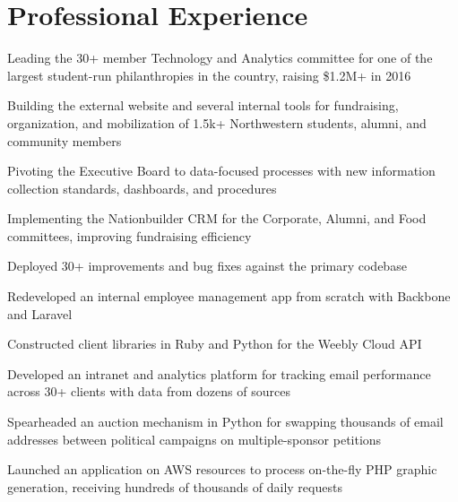 
\section{Professional Experience}

\vspace{\topsep}
\begin{listitems}
\item Leading the 30+ member Technology and Analytics committee for one of the largest student-run philanthropies in the country, raising \$1.2M+ in 2016
\item Building the external website and several internal tools for fundraising, organization, and mobilization of 1.5k+ Northwestern students, alumni, and community members
\item Pivoting the Executive Board to data-focused processes with new information collection standards, dashboards, and procedures
\item Implementing the Nationbuilder CRM for the Corporate, Alumni, and Food committees, improving fundraising efficiency
\end{listitems}
\sectionsep

\begin{listitems}
\item Deployed 30+ improvements and bug fixes against the primary codebase
\item Redeveloped an internal employee management app from scratch with Backbone and Laravel
\item Constructed client libraries in Ruby and Python for the Weebly Cloud API
\end{listitems}
\sectionsep

\begin{listitems}
\item Developed an intranet and analytics platform for tracking email performance across 30+ clients with data from dozens of sources
\item Spearheaded an auction mechanism in Python for swapping thousands of email addresses between political campaigns on multiple-sponsor petitions
\item Launched an application on AWS resources to process on-the-fly PHP graphic generation, receiving hundreds of thousands of daily requests
\end{listitems}
\sectionsep


